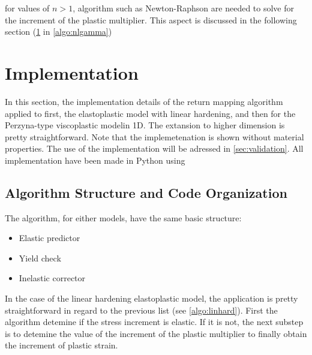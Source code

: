 \documentclass[final,5p,times,twocolumn]{elsarticle}
\begin{document}
for values of $n>1$, algorithm such as Newton-Raphson are needed to solve for the increment of the plastic multiplier. This aspect is discussed in the following section (\cref{sec:implementation} in  \cref{algo:nlgamma})

\section{Implementation}
\label{sec:implementation}
In this section, the implementation details of the return mapping algorithm applied to first, the elastoplastic model with linear hardening, and then for the Perzyna-type viscoplastic modelin 1D. The extansion to higher dimension is pretty straightforward. Note that the implemetenation is shown without material properties. The use of the implementation will be adressed in \cref{sec:validation}. All implementation have been made in Python using \cite{2020SciPy-NMeth,harris2020array}

\subsection{Algorithm Structure and Code Organization}
\label{Algorithm Structure}
The algorithm, for either models, have the same basic structure:
\begin{itemize}
  \item Elastic predictor
  \item Yield check
  \item Inelastic corrector
\end{itemize}

In the case of the linear hardening elastoplastic model, the application is pretty straightforward in regard to the previous list (see \cref{algo:linhard}). First the algorithm detemine if the stress increment is elastic. If it is not, the next substep is to detemine the value of the increment of the plastic multiplier to finally obtain the increment of plastic strain.
\end{document}
